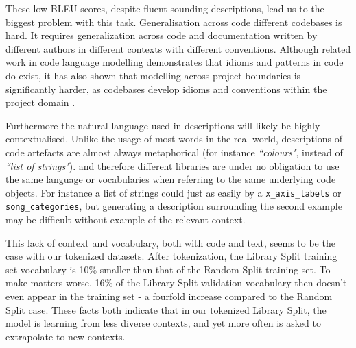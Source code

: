 These low BLEU scores, despite fluent sounding descriptions, lead us to the biggest problem with this task.
Generalisation across code different codebases is hard.  It requires generalization across code and documentation written by different authors in different contexts with different conventions. 
Although related work in code language modelling demonstrates that idioms and patterns in code do exist\cite{allamanis_mining_nodate}, it has also shown that modelling across project boundaries is significantly harder,
as codebases develop idioms and conventions within the project domain \cite{Hindle:2012:NS:2337223.2337322}. 

Furthermore the natural language used in descriptions will likely be highly contextualised. 
Unlike the usage of most words in the real world, descriptions of code artefacts are almost always metaphorical (for instance \textit{``colours"}, instead of \textit{``list of strings"}).  and therefore different libraries are under no obligation to use the same language or vocabularies when referring to the same underlying code objects. 
For instance a list of strings could just as easily by a \texttt{x_axis_labels} or \texttt{song_categories}, but generating a description surrounding the second example may be difficult without example of the relevant context.

This lack of context and vocabulary, both with code and text,  seems to be the case with our tokenized datasets.
After tokenization, the Library Split training set vocabulary is 10\% smaller than that of the Random Split training set. To make matters worse, 16\% of the Library Split validation vocabulary then doesn't even appear in the training set - a fourfold increase compared to the Random Split case.
These facts both indicate that in our tokenized Library Split, the model is learning from less diverse contexts, and yet more often is asked to extrapolate to new contexts.



